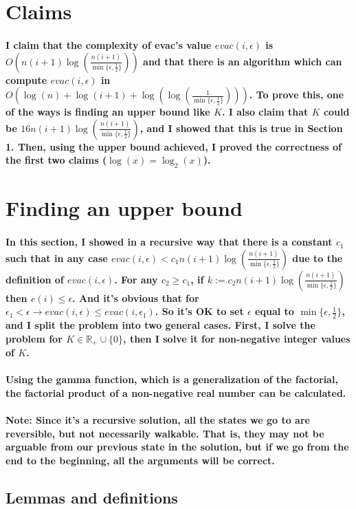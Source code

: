 \documentclass[oneside]{book}
\newcommand{\myparagraph}[1]{\paragraph{\textnormal{#1}}}
\begin{document}
\small

\section*{Claims}

\myparagraph{
I claim that the complexity of evac's value $evac(i, \epsilon)$ is $O(n(i+1)\log(\frac{n(i+1)}{\min\{\epsilon, \frac{1}{2}\}}))$ and that there is an algorithm which can compute $evac(i, \epsilon)$ in $O(\log(n)+\log(i+1)+\log(\log(\frac{1}{\min\{\epsilon, \frac{1}{2}\}})))$. To prove this, one of the ways is finding an upper bound like $K$. I also claim that $K$ could be $16n(i+1)\log(\frac{n(i+1)}{\min\{\epsilon, \frac{1}{2}\}})$, and I showed that this is true in Section 1. Then, using the upper bound achieved, I proved the correctness of the first two claims ($\log(x) = \log_2(x)$).
}

\section{Finding an upper bound}

\myparagraph{
In this section, I showed in a recursive way that there is a constant $c_1$ such that in any case $evac(i, \epsilon) < c_1 n(i+1)\log(\frac{n(i+1)}{\min\{\epsilon, \frac{1}{2}\}})$ due to the definition of $evac(i, \epsilon)$. For any $c_2 \ge c_1$, if $k := c_2 n(i+1)\log(\frac{n(i+1)}{\min\{\epsilon, \frac{1}{2}\}})$ then $e(i) \le \epsilon$. And it's obvious that for $\epsilon_1 < \epsilon \rightarrow evac(i, \epsilon) \le evac(i, \epsilon_1)$. So it's OK to set $\epsilon$ equal to $\min\{\epsilon, \frac{1}{2}\}$, and I split the problem into two general cases. First, I solve the problem for $K \in \mathbb{R}_+ \cup \{0\}$, then I solve it for non-negative integer values of $K$.
}

\myparagraph{
Using the gamma function, which is a generalization of the factorial, the factorial product of a non-negative real number can be calculated.
}

\myparagraph{
\textbf{Note:} Since it's a recursive solution, all the states we go to are reversible, but not necessarily walkable. That is, they may not be arguable from our previous state in the solution, but if we go from the end to the beginning, all the arguments will be correct.
}

\subsection{Lemmas and definitions}
\end{document}

